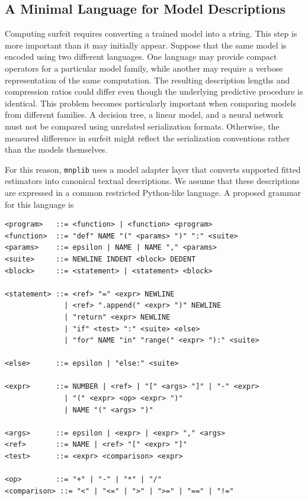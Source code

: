 
\subsection*{A Minimal Language for Model Descriptions}

Computing surfeit requires converting a trained model into a string. This step is more important than it may initially appear. Suppose that the same model is encoded using two different languages. One language may provide compact operators for a particular model family, while another may require a verbose representation of the same computation. The resulting description lengths and compression ratios could differ even though the underlying predictive procedure is identical. This problem becomes particularly important when comparing models from different families. A decision tree, a linear model, and a neural network must not be compared using unrelated serialization formats. Otherwise, the measured difference in surfeit might reflect the serialization conventions rather than the models themselves.

For this reason, \texttt{mnplib} uses a model adapter layer that converts supported fitted estimators into canonical textual descriptions. We assume that these descriptions are expressed in a common restricted Python-like language. A proposed grammar for this language is

\begin{sourcecode}
{\scriptsize
\begin{verbatim}
<program>   ::= <function> | <function> <program>
<function>  ::= "def" NAME "(" <params> ")" ":" <suite>
<params>    ::= epsilon | NAME | NAME "," <params>
<suite>     ::= NEWLINE INDENT <block> DEDENT
<block>     ::= <statement> | <statement> <block>

<statement> ::= <ref> "=" <expr> NEWLINE
              | <ref> ".append(" <expr> ")" NEWLINE
              | "return" <expr> NEWLINE
              | "if" <test> ":" <suite> <else>
              | "for" NAME "in" "range(" <expr> "):" <suite>

<else>      ::= epsilon | "else:" <suite>

<expr>      ::= NUMBER | <ref> | "[" <args> "]" | "-" <expr>
              | "(" <expr> <op> <expr> ")"
              | NAME "(" <args> ")"

<args>      ::= epsilon | <expr> | <expr> "," <args>
<ref>       ::= NAME | <ref> "[" <expr> "]"
<test>      ::= <expr> <comparison> <expr>

<op>        ::= "+" | "-" | "*" | "/"
<comparison> ::= "<" | "<=" | ">" | ">=" | "==" | "!="
\end{verbatim}
}
\end{sourcecode}

